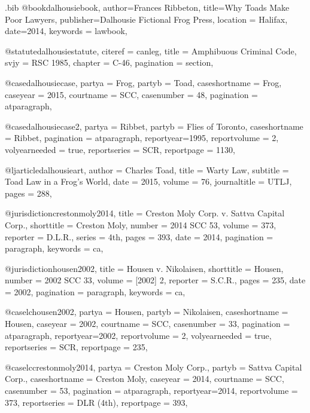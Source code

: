 \begin{filecontents*}[overwrite]{\jobname.bib}
@book{dalhousiebook,
author={Frances Ribbeton},
title={Why Toads Make Poor Lawyers},
publisher={Dalhousie Fictional Frog Press},
location = {Halifax},
date={2014},
keywords = {lawbook},
}

@statute{dalhousiestatute,
citeref = {canleg},
title = {Amphibuous Criminal Code},
svjy = {RSC 1985},
chapter = {C-46},
pagination = {section},
}

@case{dalhousiecase,
  partya = {Frog}, 
  partyb = {Toad},
  caseshortname = {Frog},
  caseyear = {2015},
  courtname = {SCC},
  casenumber = {48},
  pagination = {atparagraph},
	}

@case{dalhousiecase2,
  partya = {Ribbet}, 
  partyb = {Flies of Toronto},
  caseshortname = {Ribbet},
  pagination = {atparagraph},
  reportyear={1995},
  reportvolume = {2},
  volyearneeded = {true},
  reportseries = {SCR},
  reportpage = {1130},
	}


@ljarticle{dalhousieart,
author = {Charles Toad},
title = {Warty Law},
subtitle = {Toad Law in a Frog's World},
date = {2015},
volume = {76},
journaltitle = {UTLJ},
pages = {288},
}



@jurisdiction{crestonmoly2014,
title = {Creston Moly Corp. v. Sattva Capital Corp.},
shorttitle = {Creston Moly},
number = {2014 SCC 53},
volume = {373},
reporter = {D.L.R.},
series = {4th},
pages = {393},
date = {2014},
pagination = {paragraph},
keywords = {ca},
}

@jurisdiction{housen2002,
title = {Housen v. Nikolaisen},
shorttitle = {Housen},
number = {2002 SCC 33},
volume = {[2002] 2},
reporter = {S.C.R.},
pages = {235},
date = {2002},
pagination = {paragraph},
keywords = {ca},
}

@case{lchousen2002,
  partya = {Housen}, 
  partyb = {Nikolaisen},
  caseshortname = {Housen},
  caseyear = {2002},
  courtname = {SCC},
  casenumber = {33},
  pagination = {atparagraph},
  reportyear={2002},
  reportvolume = {2},
  volyearneeded = {true},
  reportseries = {SCR},
  reportpage = {235},
	}

@case{lccrestonmoly2014,
  partya = {Creston Moly Corp.\@}, 
  partyb = {Sattva Capital Corp.},
  caseshortname = {Creston Moly},
  caseyear = {2014},
  courtname = {SCC},
  casenumber = {53},
  pagination = {atparagraph},
  reportyear={2014},
  reportvolume = {373},
  reportseries = {DLR (4th)},
  reportpage = {393},
	}





\end{filecontents*}
